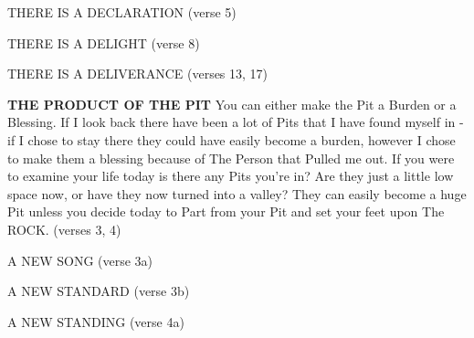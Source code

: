 \begin{compactenum}[I.]
    \begin{compactenum}
        \item THERE IS A DECLARATION (verse 5)
        \item THERE IS A DELIGHT (verse 8)
        \item THERE IS A DELIVERANCE (verses 13, 17)
    \end{compactenum}
    \item \textbf{THE PRODUCT OF THE PIT} You can either make the Pit a Burden or a Blessing. If I look back there have been a lot of Pits that I have found myself in - if I chose to stay there they could have easily become a burden, however I chose to make them a blessing because of The Person that Pulled me out. If you were to examine your life today is there any Pits you’re in? Are they just a little low space now, or have they now turned into a valley? They can easily become a huge Pit unless you decide today to Part from your Pit and set your feet upon The ROCK.  (verses 3, 4) 
    \begin{compactenum}
            \item A NEW SONG (verse 3a)
            \item A NEW STANDARD (verse 3b)
            \item A NEW STANDING (verse 4a)
    \end{compactenum}
\end{compactenum}

